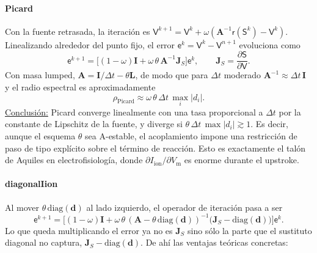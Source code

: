 \documentclass[11pt,a4paper]{article}
\newcommand{\Vm}{V_{\text{m}}}
\newcommand{\Iion}{I_{\mathrm{ion}}}
\newcommand{\Lop}{\mathbf{L}}
\newcommand{\Aimp}{\mathbf{A}}
\begin{document}
\paragraph{Picard} Con la fuente retrasada, la iteración es $\mathsf{V}^{k+1}=\mathsf{V}^k+\omega(\Aimp^{-1}\mathsf{r}(\mathsf{S}^k)-\mathsf{V}^k)$. Linealizando alrededor del punto fijo, el error $\mathsf{e}^k=\mathsf{V}^k-\mathsf{V}^{n+1}$ evoluciona como
$$
\mathsf{e}^{k+1}=\big[(1-\omega)\mathbf{I}+\omega\,\theta\,\Aimp^{-1}\mathbf{J}_S\big]\mathsf{e}^k,\qquad \mathbf{J}_S=\frac{\partial\mathsf{S}}{\partial\mathsf{V}}.
$$
Con masa lumped, $\Aimp=\mathbf{I}/\Delta t-\theta\Lop$, de modo que para $\Delta t$ moderado $\Aimp^{-1}\approx\Delta t\,\mathbf{I}$ y el radio espectral es aproximadamente
$$
\rho_{\text{Picard}}\approx\omega\,\theta\,\Delta t\,\max_i|d_i| .
$$
\underline{Conclusión:} Picard converge linealmente con una tasa proporcional a $\Delta t$ por la constante de Lipschitz de la fuente, y diverge si $\theta\,\Delta t\,\max|d_i|\gtrsim1$. Es decir, aunque el esquema $\theta$ sea A-estable, el acoplamiento impone una restricción de paso de tipo explícito sobre el término de reacción. Esto es exactamente el talón de Aquiles en electrofisiología, donde $\partial\Iion/\partial\Vm$ es enorme durante el upstroke.

\paragraph{diagonalIion} Al mover $\theta\,\mathrm{diag}(\mathbf{d})$ al lado izquierdo, el operador de iteración pasa a ser
$$
\mathsf{e}^{k+1}=\big[(1-\omega)\mathbf{I}+\omega\,\theta\,(\Aimp-\theta\,\mathrm{diag}(\mathbf{d}))^{-1}\big(\mathbf{J}_S-\mathrm{diag}(\mathbf{d})\big)\big]\mathsf{e}^k .
$$
Lo que queda multiplicando el error ya no es $\mathbf{J}_S$ sino sólo la parte que el sustituto diagonal no captura, $\mathbf{J}_S-\mathrm{diag}(\mathbf{d})$. De ahí las ventajas teóricas concretas:
\end{document}
